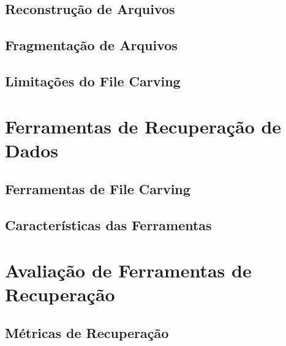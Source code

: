\documentclass[cic,diss,portuguese]{infufrgs}
\begin{document}
\subsection{Reconstrução de Arquivos}

\subsection{Fragmentação de Arquivos}

\subsection{Limitações do File Carving}

\section{Ferramentas de Recuperação de Dados}

\subsection{Ferramentas de File Carving}

\subsection{Características das Ferramentas}

\section{Avaliação de Ferramentas de Recuperação}

\subsection{Métricas de Recuperação}
\end{document}
